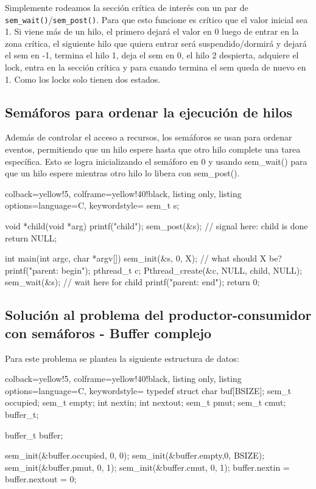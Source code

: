 \documentclass[openany]{book}
\begin{document}
Simplemente rodeamos la sección crítica de interés con un par de \texttt{sem\_wait()}/\texttt{sem\_post()}. Para que esto funcione es crítico que el valor inicial sea 1. Si viene más de un hilo, el primero dejará el valor en 0 luego de entrar en la zona crítica, el siguiente hilo que quiera entrar será suspendido/dormirá y dejará el sem en -1, termina el hilo 1, deja el sem en 0, el hilo 2 despierta, adquiere el lock, entra en la sección crítica y para cuando termina el sem queda de nuevo en 1. Como los locks solo tienen dos estados.

\subsection{Semáforos para ordenar la ejecución de hilos}

Además de controlar el acceso a recursos, los semáforos se usan para ordenar eventos, permitiendo que un hilo espere hasta que otro hilo complete una tarea específica. Esto se logra inicializando el semáforo en 0 y usando sem\_wait() para que un hilo espere mientras otro hilo lo libera con sem\_post().

\begin{tcblisting}{colback=yellow!5, colframe=yellow!40!black, listing only, listing options={language=C, keywordstyle=\color{blue!35!white}\bfseries}}
sem_t s;
    
void *child(void *arg) {
    printf("child\n");
    sem_post(&s); // signal here: child is done
    return NULL;
}

int main(int argc, char *argv[]) {
    sem_init(&s, 0, X); // what should X be?
    printf("parent: begin\n");
    pthread_t c;
    Pthread_create(&c, NULL, child, NULL);
    sem_wait(&s); // wait here for child
    printf("parent: end\n");
    return 0;
}
\end{tcblisting}

\newpage
\subsection{Solución al problema del productor-consumidor con semáforos - Buffer complejo}

Para este problema se plantea la siguiente estructura de datos:

\begin{tcblisting}{colback=yellow!5, colframe=yellow!40!black, listing only, listing options={language=C, keywordstyle=\color{blue!35!white}\bfseries}}
typedef struct {
    char buf[BSIZE];
    sem_t occupied;
    sem_t empty;
    int nextin;
    int nextout;
    sem_t pmut;
    sem_t cmut;
} buffer_t;

buffer_t buffer;

sem_init(&buffer.occupied, 0, 0);
sem_init(&buffer.empty,0, BSIZE);
sem_init(&buffer.pmut, 0, 1);
sem_init(&buffer.cmut, 0, 1);
buffer.nextin = buffer.nextout = 0;
\end{tcblisting}
\end{document}
